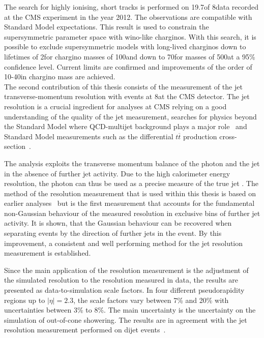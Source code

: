 The search for highly ionising, short tracks is performed on 19.7\fbinv of 8\tev data recorded at the CMS experiment in the year 2012.
The observations are compatible with Standard Model expectations.
This result is used to constrain the supersymmetric parameter space with wino-like charginos.
With this search, it is possible to exclude supersymmetric models with long-lived charginos down to lifetimes of 2\cm for chargino masses of 100\gev and down to 70\cm for masses of 500\gev at a 95\% confidence level.
Current limits are confirmed and improvements of the order of 10-40\gev in chargino mass are achieved.\\

The second contribution of this thesis consists of the measurement of the jet transverse-momentum resolution with \GAMJET events at 8\tev at the CMS detector.
The jet \pt resolution is a crucial ingredient for analyses at CMS relying on a good understanding of the quality of the jet \pt measurement, \eg searches for physics beyond the Standard Model where QCD-multijet background plays a major role~\cite{bib:CMS:RA2_8TeV,bib:CMS:MT2_8TeV,bib:CMS:AlphaT_8TeV} and Standard Model measurements such as the differential $t\overline{t}$ production cross-section~\cite{bib:CMS:TopCrossSection_8TeV}.

The analysis exploits the transverse momentum balance of the photon and the jet in the absence of further jet activity.
Due to the high calorimeter energy resolution, the photon \pt can thus be used as a precise measure of the true jet \pt.
The method of the resolution measurement that is used within this thesis is based on earlier analyses~\cite{bib:CMS:JERCPaper_2011,CMS:PAS:JETResolution_7TeV} but is the first measurement that accounts for the fundamental non-Gaussian behaviour of the measured resolution in exclusive bins of further jet activity.
It is shown, that the Gaussian behaviour can be recovered when separating events by the direction of further jets in the event.
By this improvement, a consistent and well performing method for the jet \pt resolution measurement is established.

Since the main application of the resolution measurement is the adjustment of the simulated resolution to the resolution measured in data, the results are presented as data-to-simulation scale factors.
In four different pseudorapidity regions up to $|\eta|=2.3$, the scale factors vary between 7\% and 20\% with uncertainties between 3\% to 8\%.
The main uncertainty is the uncertainty on the simulation of out-of-cone showering.
The results are in agreement with the jet \pt resolution measurement performed on dijet events~\cite{bib:Kristin_Thesis}.\\

